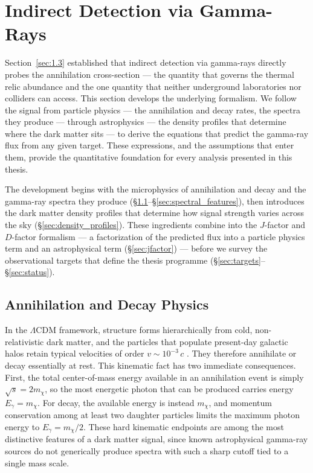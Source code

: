 
\section{Indirect Detection via Gamma-Rays}
\label{sec:1.4}

Section~\ref{sec:1.3} established that indirect detection via gamma-rays directly probes the annihilation cross-section --- the quantity that governs the thermal relic abundance and the one quantity that neither underground laboratories nor colliders can access.
This section develops the underlying formalism.
We follow the signal from particle physics --- the annihilation and decay rates, the spectra they produce --- through astrophysics --- the density profiles that determine where the dark matter sits --- to derive the equations that predict the gamma-ray flux from any given target.
These expressions, and the assumptions that enter them, provide the quantitative foundation for every analysis presented in this thesis.

The development begins with the microphysics of annihilation and decay and the gamma-ray spectra they produce (\S\ref{sec:ann_decay}--\S\ref{sec:spectral_features}), then introduces the dark matter density profiles that determine how signal strength varies across the sky (\S\ref{sec:density_profiles}).
These ingredients combine into the $J$-factor and $D$-factor formalism --- a factorization of the predicted flux into a particle physics term and an astrophysical term (\S\ref{sec:jfactor}) --- before we survey the observational targets that define the thesis programme (\S\ref{sec:targets}--\S\ref{sec:status}).

\subsection{Annihilation and Decay Physics}
\label{sec:ann_decay}

In the $\Lambda$CDM framework, structure forms hierarchically from cold, non-relativistic dark matter, and the particles that populate present-day galactic halos retain typical velocities of order $v \sim 10^{-3}\, c$ \cite{Hooper:2024}.
They therefore annihilate or decay essentially at rest.
This kinematic fact has two immediate consequences.
First, the total center-of-mass energy available in an annihilation event is simply $\sqrt{s} = 2 m_\chi$, so the most energetic photon that can be produced carries energy $E_\gamma = m_\chi$.
For decay, the available energy is instead $m_\chi$, and momentum conservation among at least two daughter particles limits the maximum photon energy to $E_\gamma = m_\chi / 2$.
These hard kinematic endpoints are among the most distinctive features of a dark matter signal, since known astrophysical gamma-ray sources do not generically produce spectra with such a sharp cutoff tied to a single mass scale.

